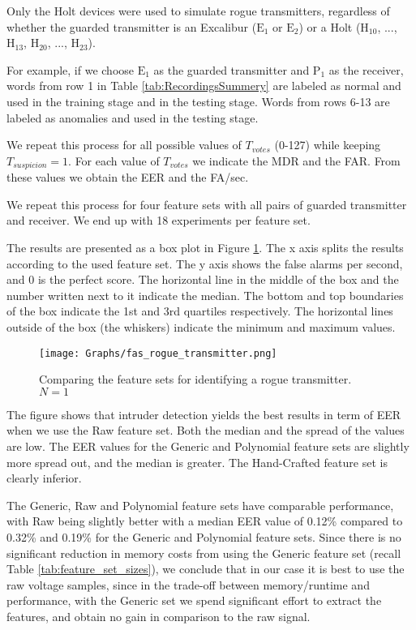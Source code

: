 \documentclass[compsoc,conference,a4paper]{IEEEtran}
\begin{document}
  Only the Holt devices were used to simulate rogue transmitters, regardless of whether the guarded transmitter is an Excalibur (\(\text{E}_1\) or \(\text{E}_2\)) or a Holt (\(\text{H}_{10}\), ..., \(\text{H}_{13}\), \(\text{H}_{20}\), ..., \(\text{H}_{23}\)).
  
  For example, if we choose \(\text{E}_1\) as the guarded transmitter and \(\text{P}_1\) as the receiver, words from row 1 in Table \ref{tab:RecordingsSummery} are labeled as normal and used in the training stage and in the testing stage. Words from rows 6-13 are labeled as anomalies and used in the testing stage.
  
  We repeat this process for all possible values of $T_{votes}$ (0-127) while keeping $T_{suspicion} = 1$. For each value of $T_{votes}$ we indicate the MDR and the FAR. From these values we obtain the EER and the FA/sec.
  
  We repeat this process for four feature sets with all pairs of guarded transmitter and receiver. We end up with 18 experiments per feature set.
  
  The results are presented as a box plot in Figure \ref{fig:rogue_transmitter_results}. The x axis splits the results according to the used feature set. The y axis shows the false alarms per second, and 0 is the perfect score. The horizontal line in the middle of the box and the number written next to it indicate the median. The bottom and top boundaries of the box indicate the 1st and 3rd quartiles respectively. The horizontal lines outside of the box (the whiskers) indicate the minimum and maximum values.
  
  \begin{figure}[t]
    \centering
    \texttt{[image: Graphs/fas\_rogue\_transmitter.png]}
    \caption{Comparing the feature sets for identifying a rogue transmitter. \(N = 1\)}
    \label{fig:rogue_transmitter_results}
  \end{figure}
  
  The figure shows that intruder detection yields the best results in term of EER when we use the Raw feature set. Both the median and the spread of the values are low. The EER values for the Generic and Polynomial feature sets are slightly more spread out, and the median is greater. The Hand-Crafted feature set is clearly inferior.
  
  The Generic, Raw and Polynomial feature sets have comparable performance, with Raw being slightly better with a median EER value of 0.12\% compared to 0.32\% and 0.19\% for the Generic and Polynomial feature sets. Since there is no significant reduction in memory costs from using the Generic feature set (recall Table \ref{tab:feature_set_sizes}), we conclude that in our case it is best to use the raw voltage samples, since in the trade-off between memory/runtime and performance, with the Generic set we spend significant effort to extract the features, and obtain no gain in comparison to the raw signal.
  
\end{document}
